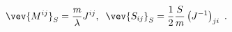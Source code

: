 \begin{equation}
\label{eq:Condi2}
\vev{M^{ij}}_S=\frac{m}{\lambda}J^{ij}, \;\; 
\vev{S_{ij}}_S=\frac{1}{2}\frac{S}{m}\left(J^{-1}\right)_{ji} ~.
\end{equation}

